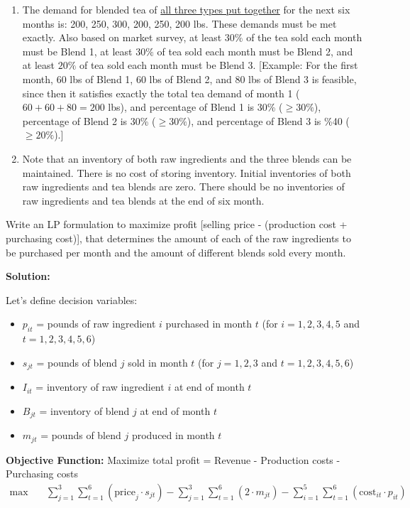 \documentclass[11pt]{article}
\begin{document}
\begin{enumerate}
\begin{enumerate}
\item The demand for blended tea of \underline{all three types put together} 
for the next six months is: 200, 250, 300, 200, 250, 200 lbs. These demands must be met exactly. Also based on market survey, at least $30\%$ of the tea sold each month must be Blend 1, at least $30\%$ of tea sold each month must be Blend 2, and at least $20\%$ of tea sold each month must be Blend 3. [Example: For the first month,
60 lbs of Blend 1, 60 lbs of Blend 2, and 80 lbs of Blend 3 is feasible, since then it satisfies exactly the total tea demand of month 1 ($60 + 60 + 80 = 200$ lbs), and percentage of Blend 1 is 30\% ($\geq 30\%$), percentage of Blend 2 is 30\% ($\geq 30\%$), and percentage of Blend 3 is \%40 ($\geq 20\%$).]

\item Note that an inventory of both raw ingredients and the three blends can be maintained. There is no cost of storing inventory. Initial inventories of both raw ingredients and tea blends are zero. There should be no inventories of raw ingredients and tea blends at the end of six month. 
\end{enumerate}
Write an LP formulation to maximize profit [selling price - (production cost + purchasing cost)], that determines the amount of each of the raw ingredients to be purchased per month and the amount of different blends sold every month.

    \textbf{Solution:}
    
    Let's define decision variables:
    \begin{itemize}
    \item $p_{it}$ = pounds of raw ingredient $i$ purchased in month $t$ (for $i = 1,2,3,4,5$ and $t = 1,2,3,4,5,6$)
    \item $s_{jt}$ = pounds of blend $j$ sold in month $t$ (for $j = 1,2,3$ and $t = 1,2,3,4,5,6$)
    \item $I_{it}$ = inventory of raw ingredient $i$ at end of month $t$
    \item $B_{jt}$ = inventory of blend $j$ at end of month $t$
    \item $m_{jt}$ = pounds of blend $j$ produced in month $t$
    \end{itemize}
    
    \textbf{Objective Function:}
    Maximize total profit = Revenue - Production costs - Purchasing costs
    \begin{align*}
    \max \quad & \sum_{j=1}^{3} \sum_{t=1}^{6} (\text{price}_j \cdot s_{jt}) - \sum_{j=1}^{3} \sum_{t=1}^{6} (2 \cdot m_{jt}) - \sum_{i=1}^{5} \sum_{t=1}^{6} (\text{cost}_{it} \cdot p_{it})
    \end{align*}
    

\end{enumerate}
\end{document}

